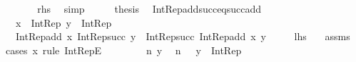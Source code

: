 \begin{isabellebody}
\ \ \isamarkupfalse%
\ \isamarkupfalse%
\ {\isachardoublequoteopen}{\isachardot}{\kern0pt}{\isachardot}{\kern0pt}{\isachardot}{\kern0pt}\ {\isacharequal}{\kern0pt}\ {\isacharquery}{\kern0pt}rhs{\isachardoublequoteclose}\ \isamarkupfalse%
\ simp\isanewline
\ \ \isamarkupfalse%
\ \isamarkupfalse%
\ {\isacharquery}{\kern0pt}thesis\ \isacommand{{\isachardot}{\kern0pt}}\isamarkupfalse%
\isanewline
{}\isamarkupfalse%
%
\endisatagproof
{\isafoldproof}%
%
\isadelimproof
\isanewline
%
\endisadelimproof
\isanewline
{}\isamarkupfalse%
\ Int{\isacharunderscore}{\kern0pt}Rep{\isacharunderscore}{\kern0pt}add{\isacharunderscore}{\kern0pt}succ{\isacharunderscore}{\kern0pt}eq{\isacharunderscore}{\kern0pt}succ{\isacharunderscore}{\kern0pt}add{\isacharcolon}{\kern0pt}\isanewline
\ \ \ {\isachardoublequoteopen}x\ {\isacharcolon}{\kern0pt}\ Int{\isacharunderscore}{\kern0pt}Rep{\isachardoublequoteclose}\ {\isachardoublequoteopen}y\ {\isacharcolon}{\kern0pt}\ Int{\isacharunderscore}{\kern0pt}Rep{\isachardoublequoteclose}\isanewline
\ \ \ {\isachardoublequoteopen}Int{\isacharunderscore}{\kern0pt}Rep{\isacharunderscore}{\kern0pt}add\ x\ {\isacharparenleft}{\kern0pt}Int{\isacharunderscore}{\kern0pt}Rep{\isacharunderscore}{\kern0pt}succ\ y{\isacharparenright}{\kern0pt}\ {\isacharequal}{\kern0pt}\ Int{\isacharunderscore}{\kern0pt}Rep{\isacharunderscore}{\kern0pt}succ\ {\isacharparenleft}{\kern0pt}Int{\isacharunderscore}{\kern0pt}Rep{\isacharunderscore}{\kern0pt}add\ x\ y{\isacharparenright}{\kern0pt}{\isachardoublequoteclose}\isanewline
\ \ \ \ {\isacharparenleft}{\kern0pt}\ {\isachardoublequoteopen}{\isacharquery}{\kern0pt}lhs\ {\isacharequal}{\kern0pt}\ {\isacharunderscore}{\kern0pt}{\isachardoublequoteclose}{\isacharparenright}{\kern0pt}\isanewline
%
\isadelimproof
%
\endisadelimproof
%
\isatagproof
{}\isamarkupfalse%
\ assms\isanewline
{}\isamarkupfalse%
\ {\isacharparenleft}{\kern0pt}cases\ x\ rule{\isacharcolon}{\kern0pt}\ Int{\isacharunderscore}{\kern0pt}RepE{\isacharparenright}{\kern0pt}\isanewline
\ \ \isacommand{{\isacharbraceleft}{\kern0pt}}\isamarkupfalse%
\isanewline
\ \ \ \ \isamarkupfalse%
\ n\ y\ \isamarkupfalse%
\ {\isachardoublequoteopen}n\ {\isasymin}\ {\isasymnat}{\isachardoublequoteclose}\ {\isachardoublequoteopen}y\ {\isacharcolon}{\kern0pt}\ Int{\isacharunderscore}{\kern0pt}Rep{\isachardoublequoteclose}\isanewline
\ \ \ \ \isamarkupfalse%

\end{isabellebody}

